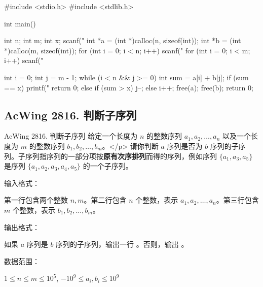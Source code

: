 \begin{mycpptwocol}[数组元素的目标和]
    #include <stdio.h>
    #include <stdlib.h>

    int main() {
        int n;
        int m;
        int x;
        scanf("%
        int *a = (int *)calloc(n, sizeof(int));
        int *b = (int *)calloc(m, sizeof(int));
        for (int i = 0; i < n; i++) {
            scanf("%
        }
        for (int i = 0; i < m; i++) {
            scanf("%
        }

        int i = 0;
        int j = m - 1;
        while (i < n && j >= 0) {
            int sum = a[i] + b[j];
            if (sum == x) {
                printf("%
                return 0;
            } else if (sum > x) {
                j--;
            } else {
                i++;
            }
        }
        free(a);
        free(b);
        return 0;
    }
\end{mycpptwocol}

\subsection{AcWing 2816. 判断子序列}
\begin{titledbox}{AcWing 2816. 判断子序列}
    给定一个长度为 $n$ 的整数序列 $a_1, a_2, \dots, a_n$ 以及一个长度为 $m$ 的整数序列 $b_1, b_2, \dots, b_m$。</p>
    请你判断 $a$ 序列是否为 $b$ 序列的子序列。子序列指序列的一部分项按\textbf{原有次序排列}而得的序列，例如序列 $\{a_1, a_3, a_5\}$ 是序列 $\{a_1, a_2, a_3, a_4, a_5\}$ 的一个子序列。

    输入格式：

    第一行包含两个整数 $n, m$。第二行包含 $n$ 个整数，表示 $a_1, a_2, \dots, a_n$。第三行包含 $m$ 个整数，表示 $b_1, b_2, \dots, b_m$。

    输出格式：

    如果 $a$ 序列是 $b$ 序列的子序列，输出一行 。否则，输出 。

    数据范围：

    $1 \le n \le m \le 10^5$, $-10^9 \le a_i,b_i \le 10^9$

    \begin{inputblock}
         \\
         \\
    \end{inputblock}
    \begin{outputblock}
    \end{outputblock}
\end{titledbox}

